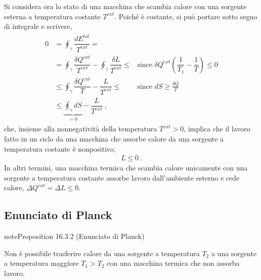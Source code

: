\documentclass[letterpaper,10pt,italian]{jupyterBook}
\begin{document}
\sphinxAtStartPar
Si considera ora lo stato di una macchina che scambia calore con una sorgente esterna a temperatura costante \(T^{ext}\). Poiché è costante, si può portare sotto segno di integrale e scrivere,
\begin{equation*}
\begin{split}\begin{aligned}
  0 & = \oint_{\gamma} \dfrac{d E^{tot}}{T^{ext}} = \\
    & = \oint_{\gamma} \dfrac{\delta Q^{ext}}{T^{ext}} - \oint_{\gamma} \dfrac{\delta L}{T^{ext}} \le & \text{since } \delta Q^{ext} \left(\dfrac{1}{T_1} - \dfrac{1}{T} \right) \le 0 \\
    & \le \oint_{\gamma} \dfrac{\delta Q^{ext}}{T} - \dfrac{L}{T^{ext}} \le & \text{since } dS \ge \frac{\delta Q}{T} \\
    & \le \underbrace{ \oint_{\gamma} d S}_{=0} - \dfrac{L}{T^{ext}} \ , %
\end{aligned}\end{split}
\end{equation*}
\sphinxAtStartPar
che, insieme alla non\sphinxhyphen{}negatività della temperatura \(T^{ext} >0\), implica che il lavoro fatto in un ciclo da una macchina che assorbe calore da una sorgente a temperatura costante è non\sphinxhyphen{}positivo,
\begin{equation*}
\begin{split}L \le 0 \ .\end{split}
\end{equation*}
\sphinxAtStartPar
In altri termini, una macchina termica che scambia calore unicamente con una sorgente a temperatura costante assorbe lavoro dall’ambiente esterno e cede calore, \(\Delta Q^{ext} = \Delta L \le 0\).


\subsection{Enunciato di Planck}
\label{\detokenize{ch/thermodynamics/heat-engine-second-principle:enunciato-di-planck}}\label{\detokenize{ch/thermodynamics/heat-engine-second-principle:physics-hs-thermodynamics-heat-engine-second-principle-planck}}\label{ch/thermodynamics/heat-engine-second-principle:proposition-1}
\begin{sphinxadmonition}{note}{Proposition 16.3.2 (Enunciato di Planck)}



\sphinxAtStartPar
Non è possibile trasferire calore da una sorgente a temperatura \(T_2\) a una sorgente a temperatura maggiore \(T_1 > T_2\) con una macchina termica che non assorba lavoro.
\end{sphinxadmonition}
\end{document}
